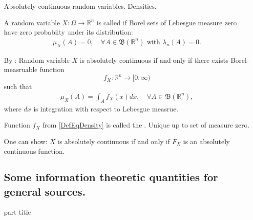 \begin{frame}{Absolutely continuous random variables. Densities.}
\bit
\item A random variable $X:\Omega\to\mathbb{R}^n$ is called  if Borel sets of Lebesgue measure zero have zero probabilty 
under its distribution:
\begin{align*}
\mu_X(A)=0,\quad \text{$\forall A\in\mathfrak{B}(\mathbb{R}^n)$ with $\lambda_n(A)=0$}.
\end{align*} 
\item By : Random variable $X$ is absolutely continuous if and only if
there exists Borel-measruable function 
\[
f_X:\mathbb{R}^n\to[0,\infty)
\]
such that 
\begin{align}\label{DefEqDensity} 
\mu_X(A)=\int_{A}f_X(x)dx,\quad \forall A\in\mathfrak{B}(\mathbb{R}^n),
\end{align}
where $dx$ is integration with respect to Lebesgue measrue. 
\item Function $f_X$ from \eqref{DefEqDensity} is called the . Unique up to set of measure zero. 
\item One can show: $X$ is absolutely continuous if and only if $F_X$ is an absolutely continuous function. 
\eit
\end{frame}


\subsection{Some information theoretic quantities for general sources.} 
\begin{frame}
 \vspace{12.0ex}
\begin{center}
\begin{beamercolorbox}[sep=12pt,center]{part title}
\insertsubsection\par
\end{beamercolorbox}
\end{center}
\end{frame}

